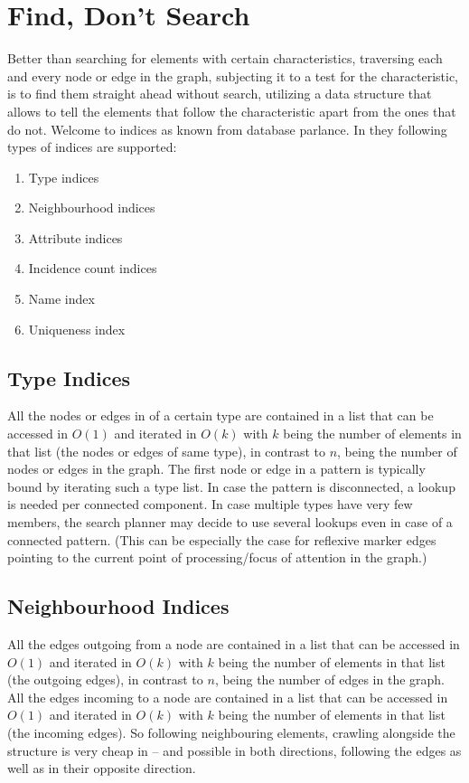 \section{Find, Don't Search}
Better than searching for elements with certain characteristics, 
traversing each and every node or edge in the graph, 
subjecting it to a test for the characteristic,
is to find them straight ahead without search,
utilizing a data structure that allows to tell the elements that follow the characteristic apart from the ones that do not.
Welcome to indices as known from database parlance.
In \GrG{} they following types of indices are supported:
\begin{enumerate}
	\item Type indices
	\item Neighbourhood indices
	\item Attribute indices
	\item Incidence count indices
	\item Name index
	\item Uniqueness index
\end{enumerate}

\subsection{Type Indices}
All the nodes or edges in \GrG{} of a certain type are contained in a list that can be accessed in $O(1)$ and iterated in $O(k)$ with $k$ being the number of elements in that list (the nodes or edges of same type), in contrast to $n$, being the number of nodes or edges in the graph.
The first node or edge in a pattern is typically bound by iterating such a type list.
In case the pattern is disconnected, a lookup is needed per connected component.
In case multiple types have very few members, the search planner may decide to use several lookups even in case of a connected pattern.
(This can be especially the case for reflexive marker edges pointing to the current point of processing/focus of attention in the graph.)

\subsection{Neighbourhood Indices}
All the edges outgoing from a node are contained in a list that can be accessed in $O(1)$ and iterated in $O(k)$ with $k$ being the number of elements in that list (the outgoing edges), in contrast to $n$, being the number of edges in the graph.
All the edges incoming to a node are contained in a list that can be accessed in $O(1)$ and iterated in $O(k)$ with $k$ being the number of elements in that list (the incoming edges).
So following neighbouring elements, crawling alongside the structure is very cheap in \GrG{ } -- and possible in both directions, following the edges as well as in their opposite direction.

